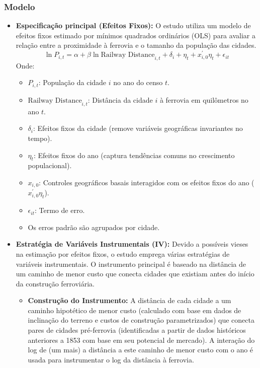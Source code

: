 \documentclass[12pt]{article}
\begin{document}
\subsubsection*{Modelo}
\begin{itemize}
    \item \textbf{Especificação principal (Efeitos Fixos):} O estudo utiliza um modelo de efeitos fixos estimado por mínimos quadrados ordinários (OLS) para avaliar a relação entre a proximidade à ferrovia e o tamanho da população das cidades.
    \begin{equation} \label{eq:india_fe}
        \ln P_{i,t} = \alpha + \beta \ln \text{Railway Distance}_{i,t} + \delta_i + \eta_t + x_{i,0}^{\prime}\eta_t + \epsilon_{it}
    \end{equation}
    Onde:
    \begin{itemize}
        \item $P_{i,t}$: População da cidade $i$ no ano do censo $t$.
        \item $\text{Railway Distance}_{i,t}$: Distância da cidade $i$ à ferrovia em quilômetros no ano $t$.
        \item $\delta_i$: Efeitos fixos da cidade (remove variáveis geográficas invariantes no tempo).
        \item $\eta_t$: Efeitos fixos do ano (captura tendências comuns no crescimento populacional).
        \item $x_{i,0}$: Controles geográficos basais interagidos com os efeitos fixos do ano ($x_{i,0}^{\prime}\eta_t$).
        \item $\epsilon_{it}$: Termo de erro.
        \item Os erros padrão são agrupados por cidade.
    \end{itemize}
    \item \textbf{Estratégia de Variáveis Instrumentais (IV):} Devido a possíveis vieses na estimação por efeitos fixos, o estudo emprega várias estratégias de variáveis instrumentais. O instrumento principal é baseado na distância de um caminho de menor custo que conecta cidades que existiam antes do início da construção ferroviária.
    \begin{itemize}
        \item \textbf{Construção do Instrumento:} A distância de cada cidade a um caminho hipotético de menor custo (calculado com base em dados de inclinação do terreno e custos de construção parametrizados) que conecta pares de cidades pré-ferrovia (identificadas a partir de dados históricos anteriores a 1853 com base em seu potencial de mercado). A interação do log de (um mais) a distância a este caminho de menor custo com o ano é usada para instrumentar o log da distância à ferrovia.

\end{itemize}
\end{itemize}
\end{document}
